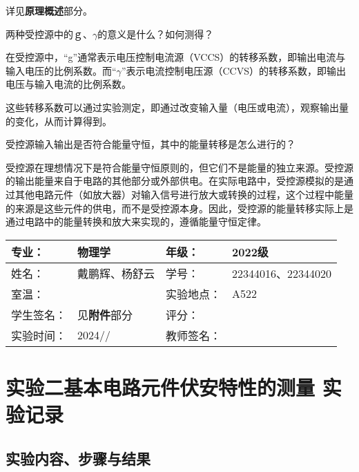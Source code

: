 \documentclass[dvipsnames, svgnames,a4paper,11pt]{article}
\begin{document}
	详见\textbf{原理概述}部分。
	
	\begin{question}
		两种受控源中的ｇ、$\gamma$的意义是什么？如何测得？
	\end{question}
	在受控源中，“g”通常表示电压控制电流源（VCCS）的转移系数，即输出电流与输入电压的比例系数。而“$\gamma$”表示电流控制电压源（CCVS）的转移系数，即输出电压与输入电流的比例系数。
	
	这些转移系数可以通过实验测定，即通过改变输入量（电压或电流），观察输出量的变化，从而计算得到。
	
	\begin{question}
		受控源输入输出是否符合能量守恒，其中的能量转移是怎么进行的？
	\end{question}
	受控源在理想情况下是符合能量守恒原则的，但它们不是能量的独立来源。受控源的输出能量来自于电路的其他部分或外部供电。在实际电路中，受控源模拟的是通过其他电路元件（如放大器）对输入信号进行放大或转换的过程，这个过程中能量的来源是这些元件的供电，而不是受控源本身。因此，受控源的能量转移实际上是通过电路中的能量转换和放大来实现的，遵循能量守恒定律。
	
	
	
	
	\clearpage
	
	\begin{table}
		\renewcommand\arraystretch{1.7}
		\centering
		\begin{tabularx}{\textwidth}{|X|X|X|X|}
			\hline
			专业： & 物理学 & 年级： & 2022级 \\
			\hline
			姓名： & 戴鹏辉、杨舒云 & 学号： & 22344016、22344020\\
			\hline
			室温： &  & 实验地点： & A522 \\
			\hline
			学生签名：& 见\textbf{附件}部分 & 评分： &\\
			\hline
			实验时间：& 2024// & 教师签名：&\\
			\hline
		\end{tabularx}
	\end{table}
	
	\section{实验二\quad 基本电路元件伏安特性的测量  \quad\heiti 实验记录}
	
	\subsection{实验内容、步骤与结果}
	
\end{document}

